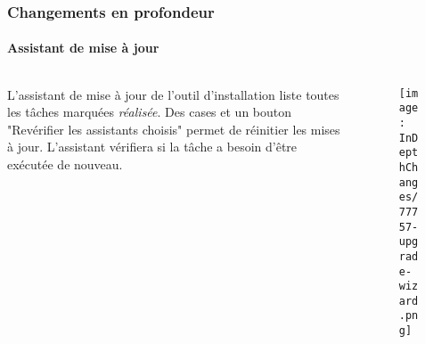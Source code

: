 \begin{frame}[fragile]
	\frametitle{Changements en profondeur}
	\framesubtitle{Assistant de mise à jour}

	\begin{columns}[T]
		\begin{column}{.5\textwidth}
			L'assistant de mise à jour de l'outil d'installation liste
			toutes les tâches marquées \textit{réalisée}.
			\newline\newline
			Des cases et un bouton "Revérifier les assistants choisis"
			permet de réinitier les mises à jour.
			L'assistant vérifiera si la tâche a besoin d'être exécutée de nouveau.
		\end{column}
		\begin{column}{.5\textwidth}
			\begin{figure}\vspace*{-0.5cm}
				\texttt{[image: InDepthChanges/77757-upgrade-wizard.png]}
			\end{figure}
		\end{column}
	\end{columns}

\end{frame}









